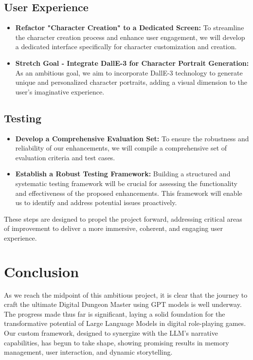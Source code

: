 \documentclass[letterpaper]{article}
\begin{document}
\subsection{User Experience}
\begin{itemize}
\item \textbf{Refactor "Character Creation" to a Dedicated Screen:} To streamline the character creation process and enhance user engagement, we will develop a dedicated interface specifically for character customization and creation.
\item \textbf{Stretch Goal - Integrate DallE-3 for Character Portrait Generation:} As an ambitious goal, we aim to incorporate DallE-3 technology to generate unique and personalized character portraits, adding a visual dimension to the user's imaginative experience.
\end{itemize}

\subsection{Testing}
\begin{itemize}
\item \textbf{Develop a Comprehensive Evaluation Set:} To ensure the robustness and reliability of our enhancements, we will compile a comprehensive set of evaluation criteria and test cases.
\item \textbf{Establish a Robust Testing Framework:} Building a structured and systematic testing framework will be crucial for assessing the functionality and effectiveness of the proposed enhancements. This framework will enable us to identify and address potential issues proactively.
\end{itemize}

These steps are designed to propel the project forward, addressing critical areas of improvement to deliver a more immersive, coherent, and engaging user experience.

\section{Conclusion}
As we reach the midpoint of this ambitious project, it is clear that the journey to craft the ultimate Digital Dungeon Master using GPT models is well underway. The progress made thus far is significant, laying a solid foundation for the transformative potential of Large Language Models in digital role-playing games. Our custom framework, designed to synergize with the LLM's narrative capabilities, has begun to take shape, showing promising results in memory management, user interaction, and dynamic storytelling.
\end{document}
